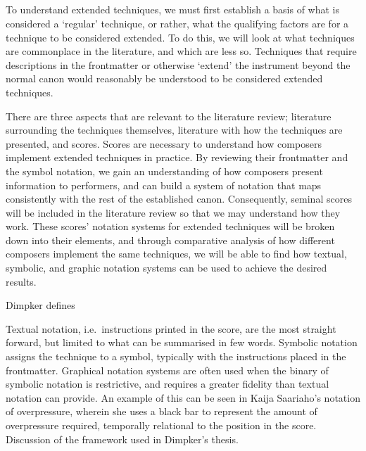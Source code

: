 \subsection{}
To understand extended techniques, we must first establish a basis of what is considered a `regular' technique, or rather, what the qualifying factors are for a technique to be considered extended.
To do this, we will look at what techniques are commonplace in the literature, and which are less so.
Techniques that require descriptions in the frontmatter or otherwise `extend' the instrument beyond the normal canon would reasonably be understood to be considered extended techniques.






There are three aspects that are relevant to the literature review; literature surrounding the techniques themselves, literature with how the techniques are presented, and scores. 
Scores are necessary to understand how composers implement extended techniques in practice.
By reviewing their frontmatter and the symbol notation, we gain an understanding of how composers present information to performers, and can build a system of notation that maps consistently with the rest of the established canon.
Consequently, seminal scores will be included in the literature review so that we may understand how they work. 
These scores' notation systems for extended techniques will be broken down into their elements, and through comparative analysis of how different composers implement the same techniques, we will be able to find how textual, symbolic, and graphic notation systems can be used to achieve the desired results.

Dimpker defines 

Textual notation, i.e.\ instructions printed in the score, are the most straight forward, but limited to what can be summarised in few words.
Symbolic notation assigns the technique to a symbol, typically with the instructions placed in the frontmatter.
Graphical notation systems are often used when the binary of symbolic notation is restrictive, and requires a greater fidelity than textual notation can provide. 
An example of this can be seen in Kaija Saariaho's notation of overpressure, wherein she uses a black bar to represent the amount of overpressure required, temporally relational to the position in the score.
Discussion of the framework used in Dimpker's thesis.\autocite[23]{dimpkerExtendedNotationDepiction2012}


